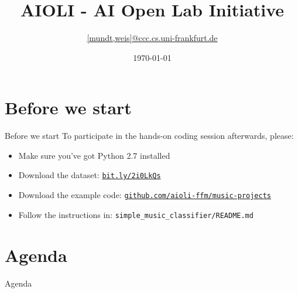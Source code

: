 \documentclass[aspectratio=169]{beamer}
\title{AIOLI - AI Open Lab Initiative}
\date{\today}
\author{\texorpdfstring{\url{[mundt,weis]@ccc.cs.uni-frankfurt.de}}{Tobias Weis}}
\institute{Systems Engineering for Computer Vision}
\begin{document}
{
\maketitle}


\section{Before we start}
	\begin{frame}{Before we start}
		To participate in the hands-on coding session afterwards, please:
		\begin{itemize}
			\item Make sure you've got Python 2.7 installed
			\item Download the dataset: \href{http://bit.ly/2i0LkQs}{ \texttt{bit.ly/2i0LkQs}}
			\item Download the example code: \href{https://github.com/aioli-ffm/music-projects}{\texttt{github.com/aioli-ffm/music-projects}}
			\item Follow the instructions in: \texttt{simple\_music\_classifier/README.md}
		\end{itemize}
	\end{frame}

\section{Agenda}
	\begin{frame}{Agenda}
		\tableofcontents
	\end{frame}
\end{document}
